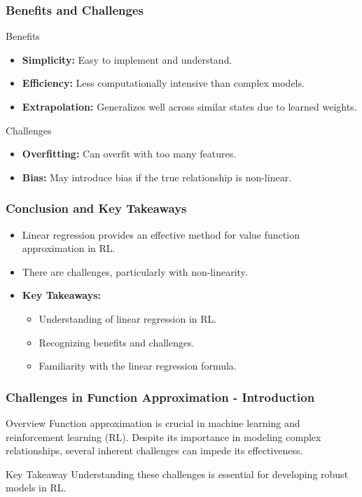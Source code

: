 \documentclass[aspectratio=169]{beamer}
\begin{document}
\begin{frame}[fragile]
    \frametitle{Benefits and Challenges}
    \begin{block}{Benefits}
        \begin{itemize}
            \item \textbf{Simplicity:} Easy to implement and understand.
            \item \textbf{Efficiency:} Less computationally intensive than complex models.
            \item \textbf{Extrapolation:} Generalizes well across similar states due to learned weights.
        \end{itemize}
    \end{block}

    \begin{block}{Challenges}
        \begin{itemize}
            \item \textbf{Overfitting:} Can overfit with too many features.
            \item \textbf{Bias:} May introduce bias if the true relationship is non-linear.
        \end{itemize}
    \end{block}
\end{frame}

\begin{frame}[fragile]
    \frametitle{Conclusion and Key Takeaways}
    \begin{itemize}
        \item Linear regression provides an effective method for value function approximation in RL.
        \item There are challenges, particularly with non-linearity.
        \item \textbf{Key Takeaways:}
            \begin{itemize}
                \item Understanding of linear regression in RL.
                \item Recognizing benefits and challenges.
                \item Familiarity with the linear regression formula.
            \end{itemize}
    \end{itemize}
\end{frame}

\begin{frame}[fragile]
    \frametitle{Challenges in Function Approximation - Introduction}
    \begin{block}{Overview}
        Function approximation is crucial in machine learning and reinforcement learning (RL). 
        Despite its importance in modeling complex relationships, several inherent challenges can impede its effectiveness.
    \end{block}
    \begin{block}{Key Takeaway}
        Understanding these challenges is essential for developing robust models in RL.
    \end{block}
\end{frame}
\end{document}
